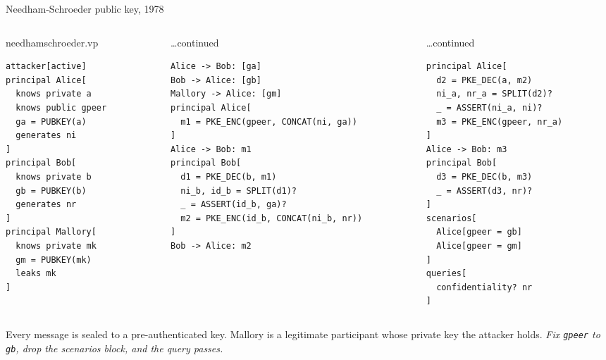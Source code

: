 \ifdefined\PRESENTATION\else\PassOptionsToClass{handout}{beamer}\fi\documentclass[aspectratio=169, lualatex]{beamer}
\newcommand{\vpcode}{\fontsize{6}{6.4}\selectfont\ttfamily\color{vpink}}
\begin{document}
\begin{frame}[fragile]{Needham-Schroeder public key, 1978}
	\begin{columns}[t]
		\begin{column}{0.32\textwidth}
			\begin{vpmodel}[top=0.5mm, bottom=0.5mm]{needhamschroeder.vp}
				\begin{lstlisting}[basicstyle=\vpcode]
attacker[active]
principal Alice[
  knows private a
  knows public gpeer
  ga = PUBKEY(a)
  generates ni
]
principal Bob[
  knows private b
  gb = PUBKEY(b)
  generates nr
]
principal Mallory[
  knows private mk
  gm = PUBKEY(mk)
  leaks mk
]
\end{lstlisting}
			\end{vpmodel}
		\end{column}
		\begin{column}{0.32\textwidth}
			\begin{vpmodel}[top=0.5mm, bottom=0.5mm]{\ldots continued}
				\begin{lstlisting}[basicstyle=\vpcode]
Alice -> Bob: [ga]
Bob -> Alice: [gb]
Mallory -> Alice: [gm]
principal Alice[
  m1 = PKE_ENC(gpeer, CONCAT(ni, ga))
]
Alice -> Bob: m1
principal Bob[
  d1 = PKE_DEC(b, m1)
  ni_b, id_b = SPLIT(d1)?
  _ = ASSERT(id_b, ga)?
  m2 = PKE_ENC(id_b, CONCAT(ni_b, nr))
]
Bob -> Alice: m2
\end{lstlisting}
			\end{vpmodel}
		\end{column}
		\begin{column}{0.32\textwidth}
			\begin{vpmodel}[top=0.5mm, bottom=0.5mm]{\ldots continued}
				\begin{lstlisting}[basicstyle=\vpcode]
principal Alice[
  d2 = PKE_DEC(a, m2)
  ni_a, nr_a = SPLIT(d2)?
  _ = ASSERT(ni_a, ni)?
  m3 = PKE_ENC(gpeer, nr_a)
]
Alice -> Bob: m3
principal Bob[
  d3 = PKE_DEC(b, m3)
  _ = ASSERT(d3, nr)?
]
scenarios[
  Alice[gpeer = gb]
  Alice[gpeer = gm]
]
queries[
  confidentiality? nr
]
\end{lstlisting}
			\end{vpmodel}
		\end{column}
	\end{columns}
	\vspace{0.1em}
	\begin{center}
		\footnotesize
		Every message is sealed to a pre-authenticated key. Mallory is a legitimate participant whose private key the attacker holds. \textit{Fix \texttt{gpeer} to \texttt{gb}, drop the scenarios block, and the query passes.}
	\end{center}
\end{frame}
\end{document}
